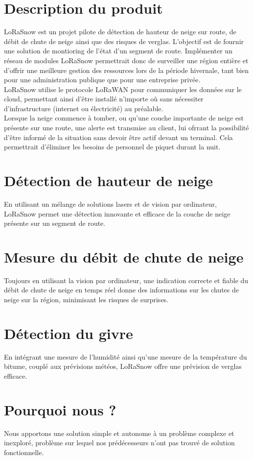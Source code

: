 \section{Description du produit}
LoRaSnow est un projet pilote de détection de hauteur de neige sur route, de débit
de chute de neige ainsi que des risques de verglas.
L'objectif est de fournir une solution de montioring de l'état d'un segment de route.
Implémenter un réseau de modules LoRaSnow permettrait donc de surveiller une région entière et d'offrir
une meilleure gestion des ressources lors de la période hivernale, tant bien pour une administration
publique que pour une entreprise privée.\\
LoRaSnow utilise le protocole LoRaWAN pour communiquer les données sur le cloud, permettant ainsi
d'être installé n'importe où sans nécessiter d'infrastructure (internet ou électricité) au préalable.\\
Lorsque la neige commence à tomber, ou qu'une couche importante de neige est présente
sur une route, une alerte est transmise au client, lui ofrrant la possibilité d'être informé de la situation
sans devoir être actif devant un terminal. Cela permettrait d'éliminer les besoins de personnel
de piquet durant la nuit.


\section{Détection de hauteur de neige}
En utilisant un mélange de solutions lasers et de vision par ordinateur,
LoRaSnow permet une détection innovante et efficace de la couche de neige
présente sur un segment de route.

\section{Mesure du débit de chute de neige}
Toujours en utilisant la vision par ordinateur, une indication correcte et fiable
du débit de chute de neige en temps réel donne des informations sur les chutes de neige
sur la région, minimisant les risques de surprises.

\section{Détection du givre}
En intégrant une mesure de l'humidité ainsi qu'une mesure de la température
du bitume, couplé aux prévisions météos, LoRaSnow offre une prévision
de verglas efficace.

\section{Pourquoi nous ?}
Nous apportons une solution simple et autonome à un problème complexe et inexploré,
problème sur lequel nos prédécesseurs n'ont pas trouvé de solution fonctionnelle.